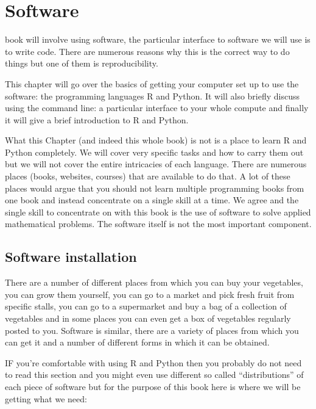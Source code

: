 \chapter[Software]{Software}

 book will involve using software, the particular
interface to software we will use is to write code. There are numerous reasons
why this is the correct way to do things but one of them is reproducibility. %

This chapter will go over the basics of getting your computer set up to use the
software: the programming languages R %
and Python. %
It will also briefly discuss using the command line: a particular interface to
your whole compute and finally it will give a brief introduction to R and
Python.

What this Chapter (and indeed this whole book) is not is a place to learn R and
Python completely. We will cover very specific tasks and how to carry them out
but we will not cover the entire intricacies of each language. There are
numerous places (books, websites, courses) that are available to do that.
A lot of these places would argue that you should not learn multiple
programming books from one book and instead concentrate on a single skill at a
time. We agree and the single skill to concentrate on with this book is the use
of software to solve applied mathematical problems. The software itself is not
the most important component.

\section{Software installation}\label{sec:software-installation}

There are a number of different places from which you can buy your vegetables,
you can grow them yourself, you can go to a market and pick fresh fruit from
specific stalls, you can go to a supermarket and buy a bag of a collection of
vegetables and in some places you can even get a box of vegetables regularly
posted to you. Software is similar, there are a variety of places from which you
can get it and a number of different forms in which it can be obtained.

IF you're comfortable with using R and Python then you probably do not need to
read this section and you might even use different so called ``distributions''
of each piece of software but for the purpose of this book here is where we will
be getting what we need:


